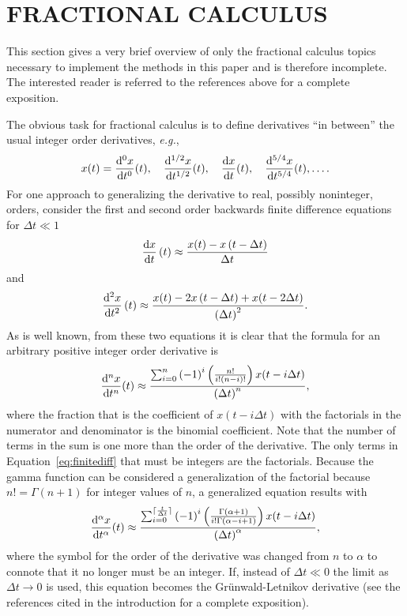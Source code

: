 \section{FRACTIONAL CALCULUS}
\label{sec:fractional}

  This section gives a very brief overview of only the fractional calculus
  topics necessary to implement the methods in this paper and is therefore
  incomplete. The interested reader is referred to the references above for a
  complete exposition.

  The obvious task for fractional calculus is to define derivatives ``in
  between'' the usual integer order derivatives, \textit{e.g.}, 
\[
x(t) = \frac{\mathrm{d}^0 x}{\mathrm{d} t^0}(t), \quad\frac{\mathrm{d}^{1/2} x}{\mathrm{d}
t^{1/2}}(t), \quad \frac{\mathrm{d} x}{\mathrm{d} t}(t),  \quad \frac{\mathrm{d}^{5/4} x}{\mathrm{d}
t^{5/4}}(t), \ldots.
\]
  For one approach to generalizing the derivative to real, possibly noninteger,
  orders, consider the first and second order backwards finite difference
  equations for $\Delta t \ll 1$
\[
 \frac{\mathrm{d} x}{\mathrm{d} t}\left(t\right) \approx \frac{x(t) - x \left(t - \Delta
 t\right)}{\Delta t}
 \]
 and
 \[
    \frac{\mathrm{d}^2 x}{\mathrm{d} t^2}\left(t\right) \approx \frac{x(t) - 2 x \left(t - \Delta
    t\right) + x(t - 2 \Delta t)}{\left( \Delta t \right)^2}.
 \]
 As is well known, from these two equations it is clear that the formula for an
 arbitrary positive integer order derivative is
 \begin{equation}
  \frac{\mathrm{d}^n x}{\mathrm{d} t^n}(t) \approx \frac{\sum_{i=0}^n \left( -1 \right)^i
  \left( \frac{n!}{i! \left( n - i \right)!} \right) x ( t - i \Delta t )}{\left( \Delta t
  \right)^n},
  \label{eq:finitediff}
 \end{equation}
 where the fraction that is the coefficient of $x(t - i \Delta t)$ with the
 factorials in the numerator and denominator is the binomial coefficient. Note
 that the number of terms in the sum is one more than the order of the
 derivative.  The only terms in Equation~\ref{eq:finitediff} that must be
 integers are the factorials. Because the gamma function can be considered a
 generalization of the factorial because $n! = \Gamma(n+1)$ for integer values
 of $n$, a generalized equation results with
 \begin{equation}
    \frac{\mathrm{d}^\alpha x}{\mathrm{d} t^\alpha}(t) \approx \frac{\sum_{i=0}^{\lceil
    \frac{t}{\Delta t} \rceil} \left( -1 \right)^i \left(
    \frac{\Gamma(\alpha+1)}{i! \Gamma\left( \alpha - i + 1\right)} \right) x ( t
    - i \Delta t )}{\left( \Delta t \right)^\alpha},
    \label{eq:gw}
 \end{equation}
 where the symbol for the order of the derivative was changed from $n$ to
 $\alpha$ to connote that it no longer must be an integer. 
 If, instead of $\Delta t \ll 0$ the limit as $\Delta t \rightarrow 0$ is used,
 this equation becomes the Gr\"unwald-Letnikov derivative (see the references
 cited in the introduction for a complete exposition). 
  
